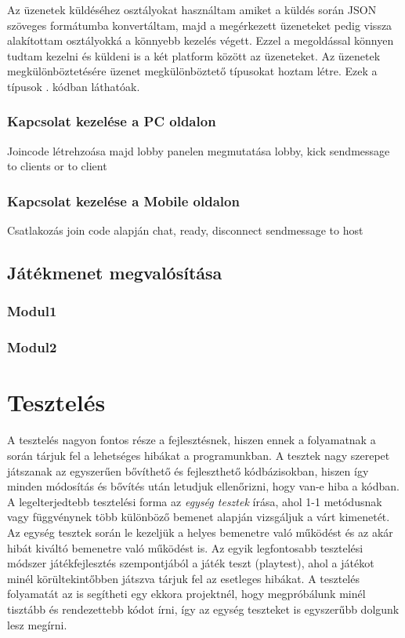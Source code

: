 \documentclass[]{thesis-ekf}
\theoremstyle{definition}
\theoremstyle{remark}
\begin{document}
Az üzenetek küldéséhez osztályokat használtam amiket a küldés során JSON szöveges formátumba konvertáltam, majd a megérkezett üzeneteket pedig vissza alakítottam osztályokká a könnyebb kezelés végett. Ezzel a megoldással könnyen tudtam kezelni és küldeni is a két platform között az üzeneteket. Az üzenetek megkülönböztetésére üzenet megkülönböztető típusokat hoztam létre. Ezek a típusok . kódban láthatóak.



\subsection{Kapcsolat kezelése a PC oldalon}

Joincode létrehzoása majd lobby panelen megmutatása
lobby, kick
sendmessage to clients or to client

\subsection{Kapcsolat kezelése a Mobile oldalon}

Csatlakozás join code alapján
chat, ready, disconnect
sendmessage to host

\section{Játékmenet megvalósítása}

\subsection{Modul1}
\subsection{Modul2}

\chapter{Tesztelés}

A tesztelés nagyon fontos része a fejlesztésnek, hiszen ennek a folyamatnak a során tárjuk fel a lehetséges hibákat a programunkban. A tesztek nagy szerepet játszanak az egyszerűen bővíthető és fejleszthető kódbázisokban, hiszen így minden módosítás és bővítés után letudjuk ellenőrizni, hogy van-e hiba a kódban. A legelterjedtebb tesztelési forma az \emph{egység tesztek} írása, ahol 1-1 metódusnak vagy függvénynek több különböző bemenet alapján vizsgáljuk a várt kimenetét. Az egység tesztek során le kezeljük a helyes bemenetre való működést és az akár hibát kiváltó bemenetre való működést is. Az egyik legfontosabb tesztelési módszer játékfejlesztés szempontjából a játék teszt (playtest), ahol a játékot minél körültekintőbben játszva tárjuk fel az esetleges hibákat. A tesztelés folyamatát az is segítheti egy ekkora projektnél, hogy megpróbálunk minél tisztább és rendezettebb kódot írni, így az egység teszteket is egyszerűbb dolgunk lesz megírni.
\end{document}

